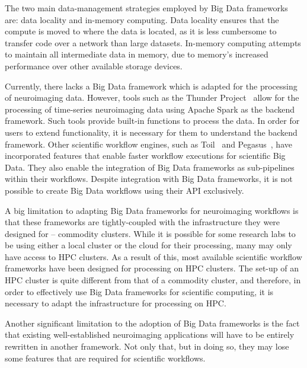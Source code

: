         The two main data-management strategies employed by Big Data frameworks
        are: data locality and in-memory computing. Data locality ensures that
        the compute is moved to where the data is located, as it is less cumbersome to
        transfer code over a network than large datasets. In-memory computing attempts
        to maintain all intermediate data in memory, due to memory's increased performance over
        other available storage devices.

        Currently, there lacks a Big Data framework which is adapted for the
        processing of neuroimaging data. However, tools such as the Thunder 
        Project~\cite{Freeman:2014aa} allow for the processing of time-series
        neuroimaging data using Apache Spark as the backend framework. Such tools
        provide built-in functions to process the data. In order for users to 
        extend functionality, it is necessary for them to understand the 
        backend framework. Other scientific workflow engines, such as 
        Toil~\cite{Vivian:2017aa} and Pegasus~\cite{DEELMAN201517}, have 
        incorporated features that enable
        faster workflow executions for scientific Big Data. They also enable
        the integration of Big Data frameworks as sub-pipelines within their 
        workflows. Despite integration with Big Data frameworks, it is not
        possible to create Big Data workflows using their API exclusively.

        A big limitation to adapting Big Data frameworks for neuroimaging 
        workflows is that these frameworks are tightly-coupled with the 
        infrastructure they were designed for -- commodity clusters. While
        it is possible for some research labs to be using either a local cluster
        or the cloud for their processing, many may only have access to HPC
        clusters. As a result of this, most available scientific workflow 
        frameworks have been designed for processing on HPC clusters. The 
        set-up of an HPC cluster is quite different from that of a commodity 
        cluster, and therefore, in order to effectively use Big Data frameworks
        for scientific computing, it is necessary to adapt the infrastructure 
        for processing on HPC.

        Another significant limitation to the adoption of Big Data frameworks is
        the fact that existing well-established neuroimaging applications will have
        to be entirely rewritten in another framework. Not only that, but in doing so,
        they may lose some features that are required for scientific workflows.


